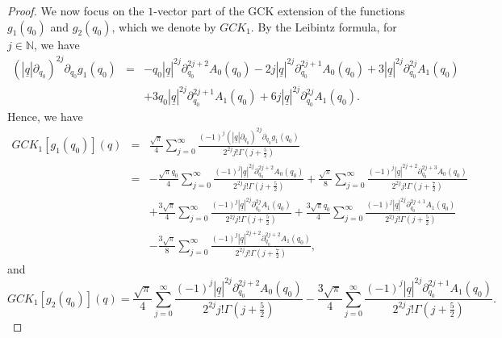 \documentclass[reqno,11pt]{amsart}
\numberwithin{equation}{section}
\theoremstyle{definition}
\begin{document}
\begin{proof}
We now focus on the $1$-vector part of the GCK extension of the functions $g_1(q_0)$ and $g_2(q_0)$, which we denote by $GCK_1$. By the Leibintz formula, for $j \in \mathbb{N}$, we have
\begin{eqnarray*}
(|\underline{q}| \partial_{q_0})^{2j} \partial_{q_0} g_1(q_0)&=&-q_0 | \underline{q}|^{2j} \partial_{q_0}^{2j+2} A_0(q_0)-2j |\underline{q}|^{2j} \partial_{q_0}^{2j+1}A_0(q_0)+3 | \underline{q}|^{2 j} \partial_{q_0}^{2j}A_1(q_0)\\
&&+3 q_0 | \underline{q}|^{2j} \partial_{q_0}^{2j+1}A_1(q_0)+6j | \underline{q}|^{2j} \partial_{q_0}^{2j} A_1(q_0).
\end{eqnarray*}
Hence, we have
\begin{eqnarray}
	\nonumber
GCK_1[g_1(q_0)](q)&=& \frac{\sqrt{\pi}}{4} \sum_{j=0}^\infty \frac{(-1)^j (|\underline{q}| \partial_{q_0})^{2j} \partial_{q_0} g_1(q_0)}{2^{2j}j! \Gamma \left(j+\frac{5}{2}\right)}\\
\nonumber
&=&- \frac{\sqrt{\pi}q_0}{4} \sum_{j=0}^\infty \frac{(-1)^j | \underline{q}|^{2j} \partial_{q_0}^{2j+2}A_0(q_0)}{2^{2j}j! \Gamma \left(j+\frac{5}{2}\right)}+ \frac{\sqrt{\pi}}{8} \sum_{j=0}^\infty \frac{(-1)^j | \underline{q}|^{2j+2} \partial_{q_0}^{2j+3}A_0(q_0)}{2^{2j} j! \Gamma \left(j+\frac{7}{2}\right)}\\
\nonumber
&&+ \frac{3 \sqrt{\pi}}{4} \sum_{j=0}^\infty \frac{(-1)^j | \underline{q}|^{2j} \partial_{q_0}^{2j}A_1(q_0)}{2^{2j}j! \Gamma \left(j+\frac{5}{2}\right)}+ \frac{3 \sqrt{\pi} q_0}{4} \sum_{j=0}^\infty \frac{(-1)^j| \underline{q}|^{2j} \partial_{q_0}^{2j+1}A_1(q_0)}{2^{2j}j! \Gamma \left(j+\frac{5}{2}\right)}\\
\label{p4}
&&-\frac{3\sqrt{\pi}}{8} \sum_{j=0}^\infty \frac{(-1)^j | \underline{q}|^{2j+2} \partial_{q_0}^{2j+2}A_1(q_0)}{2^{2j}j! \Gamma \left(j+\frac{7}{2}\right)},
\end{eqnarray}
and
\begin{equation}
\label{p5}
GCK_1[g_2(q_0)](q)= \frac{\sqrt{\pi}}{4} \sum_{j=0}^\infty \frac{(-1)^j |\underline{q}|^{2j} \partial_{q_0}^{2j+2}A_0(q_0)}{2^{2j}j!\Gamma \left(j+\frac{5}{2}\right)}- \frac{3 \sqrt{ \pi}}{4} \sum_{j=0}^{\infty} \frac{(-1)^j | \underline{q}|^{2j} \partial_{q_0}^{2j+1}A_1(q_0)}{2^{2j} j! \Gamma \left(j+ \frac{5}{2}\right)}.
\end{equation}


\end{proof}
\end{document}

